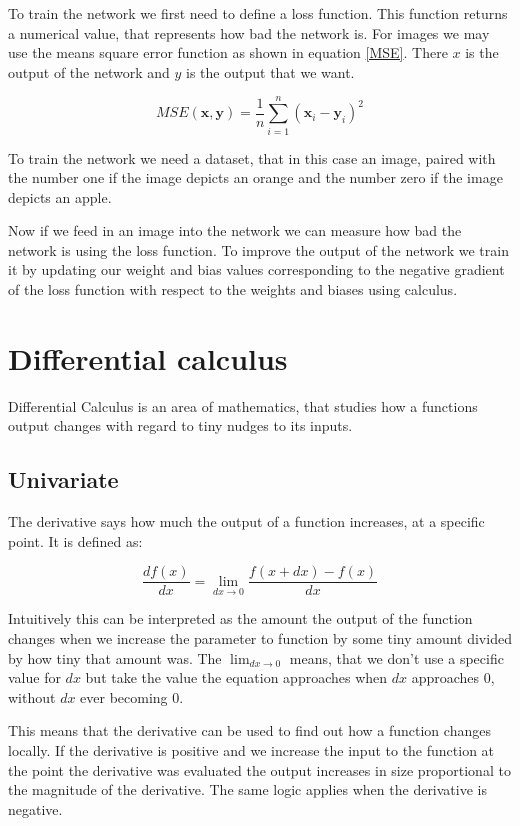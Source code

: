 To train the network we first need to define a loss function. This function returns a numerical value, that represents how bad the network is. For images we may use the means square error function as shown in equation \ref{MSE}. There $x$ is the output of the network and $y$ is the output that we want.

\begin{equation}
	MSE(\bm{x}, \bm{y}) = \frac{1}{n}\sum_{i=1}^{n}{(\bm{x}_i - \bm{y}_i)^2}
	\label{MSE}
\end{equation}

To train the network we need a dataset, that in this case an image, paired with the number one if the image depicts an orange and the number zero if the image depicts an apple.

Now if we feed in an image into the network we can measure how bad the network is using the loss function. To improve the output of the network we train it by updating our weight and bias values corresponding to the negative gradient of the loss function with respect to the weights and biases using calculus.


\section{Differential calculus}
Differential Calculus is an area of mathematics, that studies how a functions output changes with regard to tiny nudges to its inputs.


\subsection{Univariate}
The derivative says how much the output of a function increases, at a specific point. It is defined as:

\begin{equation}
	\frac{df(x)}{dx} = \lim_{dx \to 0}\frac{f(x + dx) - f(x)}{dx}
\end{equation}

Intuitively this can be interpreted as the amount the output of the function changes when we increase the parameter to function by some tiny amount divided by how tiny that amount was. The $\lim_{dx \to 0}$ means, that we don't use a specific value for $dx$ but take the value the equation approaches when $dx$ approaches $0$, without $dx$ ever becoming $0$.

This means that the derivative can be used to find out how a function changes locally. If the derivative is positive and we increase the input to the function at the point the derivative was evaluated the output increases in size proportional to the magnitude of the derivative. The same logic applies when the derivative is negative.


